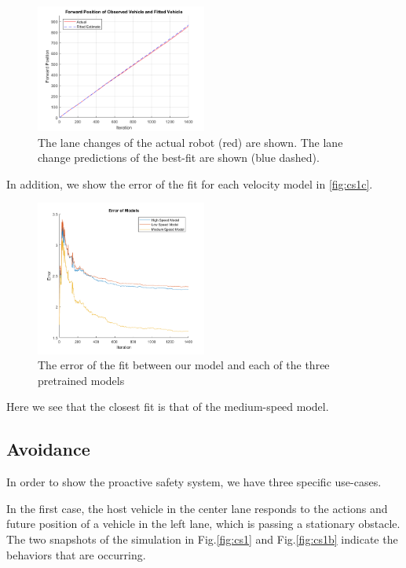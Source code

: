 \documentclass[conference]{IEEEtran}
\begin{document}
\begin{figure}[ht]
    \includegraphics[width=0.5\textwidth]{fit1.png}
    \caption{The lane changes of the actual robot (red) are shown. The lane change predictions of the best-fit are shown (blue dashed).}
    \label{fig:lanchan}
\end{figure}
 In addition, we show the error of the fit for each velocity model in \ref{fig:cs1c}.
 
 \begin{figure}[ht]
    \includegraphics[width=0.5\textwidth]{fit3.png}
    \caption{The error of the fit between our model and each of the three pretrained models}
    \label{fig:error}
\end{figure}

Here we see that the closest fit is that of the medium-speed model.
 
 
\subsection{Avoidance}
In order to show the proactive safety system, we have three specific use-cases.

In the first case, the host vehicle in the center lane responds to the actions and future position of a vehicle in the left lane, which is passing a stationary obstacle. The two snapshots of the simulation in Fig.\ref{fig:cs1} and Fig.\ref{fig:cs1b} indicate the behaviors that are occurring.
\end{document}
